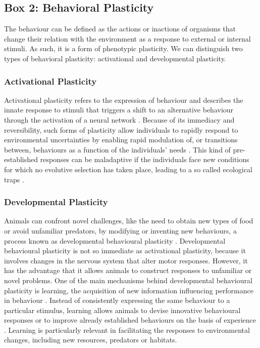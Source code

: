 \begin{small}
\begin{framed}
\subsection*{Box 2: Behavioral Plasticity}

The behaviour can be defined as the actions or inactions of organisms that
change their relation with the environment as a response to external or
internal stimuli. As such, it is a form of phenotypic plasticity. We can
distinguish two types of behavioral plasticity: activational and developmental
plasticity.

\subsubsection*{Activational Plasticity}

Activational plasticity refers to the expression of behaviour and describes the
innate response to stimuli that triggers a shift to an alternative behaviour
through the activation of a neural network \citep{Snell-Rood2013}. Because of
its immediacy and reversibility, such forms of plasticity allow individuals to
rapidly respond to environmental uncertainties by enabling rapid modulation
of, or transitions between, behaviours as a function of the individuals’ needs
\citep{Snell-Rood2013,Sol2013a}. This kind of pre-established responses can be
maladaptive if the individuals face new conditions for which no evolutive
selection has taken place, leading to a so called ecological traps
\citep{Kokko2001}.

\subsubsection*{Developmental Plasticity}

Animals can confront novel challenges, like the need to obtain new types of food
or avoid unfamiliar predators, by modifying or inventing new behaviours, a
process known as developmental behavioural plasticity \citep{Snell-Rood2013}.
Developmental behavioural plasticity is not so immediate as activational
plasticity, because it involves changes in the nervous system that alter motor
responses. However, it has the advantage that it allows animals to construct
responses to unfamiliar or novel problems. One of the main mechanisms behind
developmental behavioural plasticity is learning, the acquisition of new
information influencing performance in behaviour \citep{Dukas1998}. Instead of
consistently expressing the same behaviour to a particular stimulus, learning
allows animals to devise innovative behavioural responses or to improve already
established behaviours on the basis of experience
\citep{Lefebvre1997,Dukas1998,Reader2002,VanSchaik2003,Ricklefs2004}. Learning
is particularly relevant in facilitating the responses to environmental changes,
including new resources, predators or habitats.
\end{framed}
\end{small}


